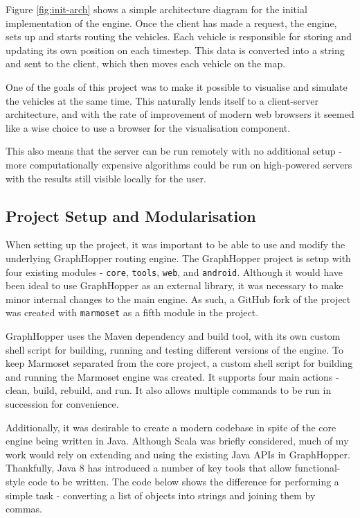 \documentclass[ %
                    author={Alexander Hill},
                supervisor={Dr. Benjamin Sach},
                    degree={MEng},
                     title={MARMOSET},
                  subtitle={Multi-Agent Route Management using Online Simulation for Efficient Transportation},
                      type={research},
                      year={2016} ]{dissertation}
\begin{document}
Figure \ref{fig:init-arch} shows a simple architecture diagram for the initial
implementation of the engine. Once the client has made a request, the engine,
sets up and starts routing the vehicles. Each vehicle is responsible for storing
and updating its own position on each timestep. This data is converted into a
string and sent to the client, which then moves each vehicle on the map.

One of the goals of this project was to make it possible to visualise and
simulate the vehicles at the same time. This naturally lends itself to a
client-server architecture, and with the rate of improvement of modern web
browsers it seemed like a wise choice to use a browser for the visualisation
component.

This also means that the server can be run remotely with no additional setup -
more computationally expensive algorithms could be run on high-powered servers
with the results still visible locally for the user.

\subsection{Project Setup and Modularisation}

When setting up the project, it was important to be able to use and modify the
underlying GraphHopper routing engine. The GraphHopper project is setup with
four existing modules - \texttt{core}, \texttt{tools}, \texttt{web}, and
\texttt{android}. Although it would have been ideal to use GraphHopper as an
external library, it was necessary to make minor internal changes to the main
engine. As such, a GitHub fork of the project was created with \texttt{marmoset}
as a fifth module in the project.

GraphHopper uses the Maven dependency and build tool, with its own custom shell
script for building, running and testing different versions of the engine. To
keep Marmoset separated from the core project, a custom shell script for
building and running the Marmoset engine was created. It supports four main
actions - clean, build, rebuild, and run. It also allows multiple commands to be
run in succession for convenience.

Additionally, it was desirable to create a modern codebase in spite of the core
engine being written in Java. Although Scala was briefly considered, much of my
work would rely on extending and using the existing Java APIs in GraphHopper.
Thankfully, Java 8 has introduced a number of key tools that allow
functional-style code to be written. The code below shows the difference for
performing a simple task - converting a list of objects into strings and joining
them by commas.
\end{document}

